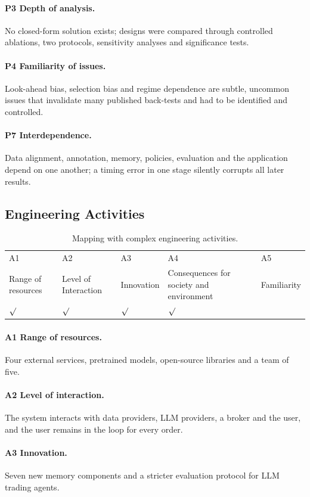 \paragraph{P3 Depth of analysis.} No closed-form solution exists; designs were compared through controlled ablations, two protocols, sensitivity analyses and significance tests.
\paragraph{P4 Familiarity of issues.} Look-ahead bias, selection bias and regime dependence are subtle, uncommon issues that invalidate many published back-tests and had to be identified and controlled.
\paragraph{P7 Inter\-dependence.} Data alignment, annotation, memory, policies, evaluation and the application depend on one another; a timing error in one stage silently corrupts all later results.

\subsection{Engineering Activities}
\begin{table}[H]
\centering
\caption{Mapping with complex engineering activities.}
\label{tab:e_act}
\small
\begin{tabular}{|*{5}{C{0.16\textwidth}|}}
\hline
A1 & A2 & A3 & A4 & A5\\
Range of resources & Level of Interaction & Innovation & Consequences for society and environment & Familiarity\\
\hline
$\surd$ & $\surd$ & $\surd$ & $\surd$ & \\
\hline
\end{tabular}
\end{table}
\paragraph{A1 Range of resources.} Four external services, pretrained models, open-source libraries and a team of five.
\paragraph{A2 Level of interaction.} The system interacts with data providers, LLM providers, a broker and the user, and the user remains in the loop for every order.
\paragraph{A3 Innovation.} Seven new memory components and a stricter evaluation protocol for LLM trading agents.
